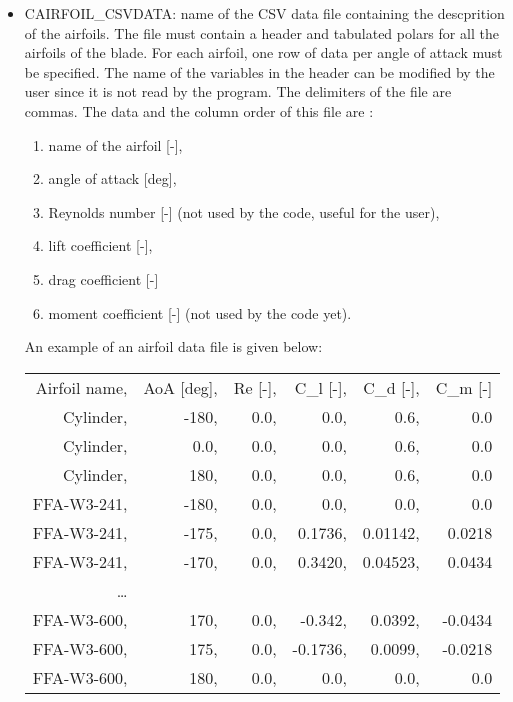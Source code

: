 \begin{itemize}
\item CAIRFOIL\_CSVDATA: name of the CSV data file containing the descprition of the airfoils. The file must contain a header and tabulated polars for all the airfoils of the blade. For each airfoil, one row of data per angle of attack must be specified. The name of the variables in the header can be modified by the user since it is not read by the program. The delimiters of the file are commas. The data and the column order of this file are : 
\begin{enumerate}
\item name of the airfoil [-],
\item angle of attack [deg],
\item Reynolds number [-] (not used by the code, useful for the user),
\item lift coefficient [-],
\item drag coefficient [-]
\item moment coefficient [-] (not used by the code yet).
\end{enumerate}
An example of an airfoil data file is given below:
\begin{center}
\begin{tabular} {|rrrrrr|}
\hline
Airfoil name,& AoA [deg],& Re [-],& C\_l [-],& C\_d [-],& C\_m [-] \\
Cylinder,    & -180,     & 0.0,   & 0.0,     & 0.6,     & 0.0    \\
Cylinder,    &  0.0,     & 0.0,   & 0.0,     & 0.6,     & 0.0    \\
Cylinder,    &  180,     & 0.0,   & 0.0,     & 0.6,     & 0.0    \\
FFA-W3-241,  & -180,     & 0.0,   & 0.0,     & 0.0,     & 0.0    \\
FFA-W3-241,  & -175,     & 0.0,   & 0.1736,  & 0.01142, & 0.0218 \\
FFA-W3-241,  & -170,     & 0.0,   & 0.3420,  & 0.04523, & 0.0434 \\
\ldots       &           &        &          &          &        \\
FFA-W3-600,  & 170,      & 0.0,   &-0.342,   & 0.0392,  &-0.0434 \\
FFA-W3-600,  & 175,      & 0.0,   &-0.1736,  & 0.0099,  &-0.0218 \\
FFA-W3-600,  & 180,      & 0.0,   & 0.0,     & 0.0,     & 0.0    \\
\hline
\end{tabular}
\end{center}


\end{itemize}
